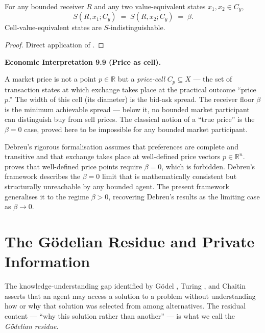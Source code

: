 \documentclass[twocolumn,11pt,a4paper]{article}
\newenvironment{econinterp}[1]{%
  \medskip\noindent\textbf{Economic Interpretation #1.}\normalfont\itshape\space
}{%
  \medskip
}
\newcommand{\R}{\mathbb{R}}
\begin{document}
\begin{theorem}
\label{thm:cellvaluetheorem}
For any bounded receiver $R$ and any two value-equivalent states
$x_1,x_2\in C_y$,
\[
  S(R,x_1;C_y)\;=\;S(R,x_2;C_y)\;=\;\beta.
\]
Cell-value-equivalent states are $S$-indistinguishable.
\end{theorem}

\begin{proof}
Direct application of .
\end{proof}

\begin{econinterp}{9.9 (Price as cell)}
A market price is not a point $p\in\R$ but a \emph{price-cell}
$C_p\subseteq X$ — the set of transaction states at which exchange takes
place at the practical outcome ``price $p$.''  The width of this cell
(its diameter) is the bid-ask spread.  The receiver floor $\beta$ is the
minimum achievable spread — below it, no bounded market participant can
distinguish buy from sell prices.  The classical notion of a ``true
price'' is the $\beta=0$ case, proved here to be impossible for any
bounded market participant.
\end{econinterp}

\begin{remark}
\label{rem:debreu}
Debreu's rigorous formalisation \cite{debreu1959} assumes that preferences
are complete and transitive and that exchange takes place at well-defined
price vectors $p\in\R^n$.   proves that
well-defined price points require $\beta=0$, which is forbidden.  Debreu's
framework describes the $\beta=0$ limit that is mathematically consistent
but structurally unreachable by any bounded agent.  The present framework
generalises it to the regime $\beta>0$, recovering Debreu's results as
the limiting case as $\beta\to 0$.
\end{remark}

\section{The G\"{o}delian Residue and Private Information}
\label{sec:godelian}

The knowledge-understanding gap identified by G\"odel \cite{godel1931},
Turing \cite{turing1936}, and Chaitin \cite{chaitin1974} asserts that
an agent may access a solution to a problem without understanding how or
why that solution was selected from among alternatives.  The residual
content — ``why this solution rather than another'' — is what we call the
\emph{G\"odelian residue}.
\end{document}
